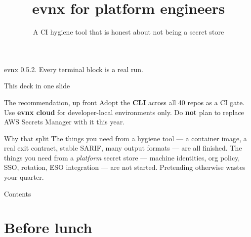 \documentclass[aspectratio=169,10pt]{beamer}
\title{evnx for platform engineers}
\subtitle{A CI hygiene tool that is honest about not being a secret store}
\date{}
\begin{document}
\begin{frame}[plain]
  \titlepage
  \begin{center}\footnotesize
  \textcolor{evnxMuted}{evnx 0.5.2. Every terminal block is a real run.}
  \end{center}
\end{frame}

\begin{frame}{This deck in one slide}
  \begin{block}{The recommendation, up front}
    Adopt the \textbf{CLI} across all 40 repos as a CI gate. Use \textbf{evnx
    cloud} for developer-local environments only. Do \textbf{not} plan to
    replace AWS Secrets Manager with it this year.
  \end{block}

  \vspace{0.7em}
  \begin{block}{Why that split}
    The things you need from a hygiene tool --- a container image, a real exit
    contract, stable SARIF, many output formats --- are all finished. The
    things you need from a \emph{platform} secret store --- machine
    identities, org policy, SSO, rotation, ESO integration --- are not
    started. Pretending otherwise wastes your quarter.
  \end{block}

\end{frame}

\begin{frame}{Contents}\tableofcontents[hideallsubsections]\end{frame}

\section{Before lunch}
\end{document}
